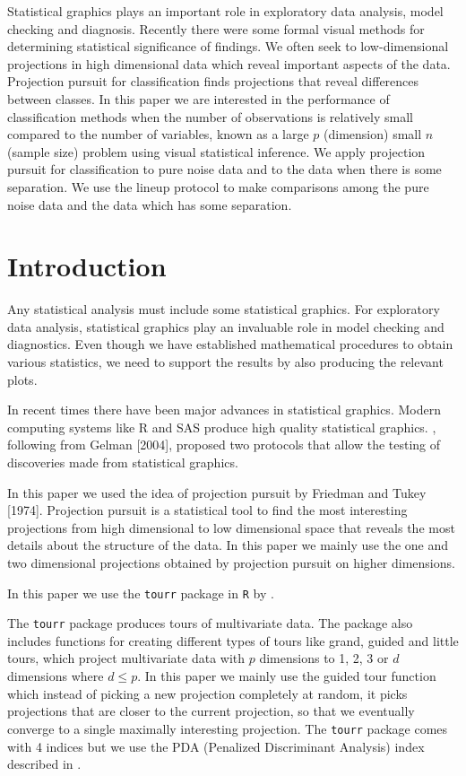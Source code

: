 \documentclass[12]{report}
\begin{document}
Statistical graphics plays an important role in exploratory data analysis, model checking and diagnosis. Recently there were some formal visual methods for determining statistical significance of findings. We often seek to low-dimensional projections in high dimensional data which reveal important aspects of the data. Projection pursuit for classification finds projections that reveal differences between classes. In this paper we are interested in the performance of classification methods when the number of observations is relatively small compared to the number of variables, known as a large $p$ (dimension) small $n$ (sample size) problem using visual statistical inference. We apply projection pursuit for classification to pure noise data and to the data when there is some separation. We use the lineup protocol \cite{buja:2009} to make comparisons among the pure noise data and the data which has some separation.

\section{Introduction} 

Any statistical analysis must include some statistical graphics. For exploratory data analysis, statistical graphics play an invaluable role in model checking and diagnostics. Even though we have established mathematical procedures to obtain various statistics, we need to support the results by also producing the relevant plots. 

In recent times there have been major advances in statistical graphics. Modern computing systems like R and SAS produce high quality statistical graphics. \cite{buja:2009}, following from Gelman [2004], proposed two protocols that allow the testing of discoveries made from statistical graphics. 

In this paper we used the idea of projection pursuit by Friedman and Tukey [1974]. Projection pursuit is a statistical tool to find the most interesting projections from high dimensional to low dimensional space that reveals the most details about the structure of the data. In this paper we mainly use the one and two dimensional projections obtained by projection pursuit on higher dimensions.

In this paper we use the \texttt{tourr} package in \texttt{R} \cite{r} by \cite{WC08}. 

The \texttt{tourr} package produces tours of multivariate data. The package also includes functions for creating different types of tours like grand, guided and little tours, which project multivariate data with $p$ dimensions to 1, 2, 3 or $d$ dimensions where $d \le p$. In this paper we mainly use the guided tour function which instead of picking a new projection completely at random, it picks projections that are closer to the current projection, so that we eventually converge to a single maximally interesting projection. The \texttt{tourr} package comes with 4 indices but we use the PDA (Penalized Discriminant Analysis)  index described in \cite{lee:2009}.      
\end{document}
